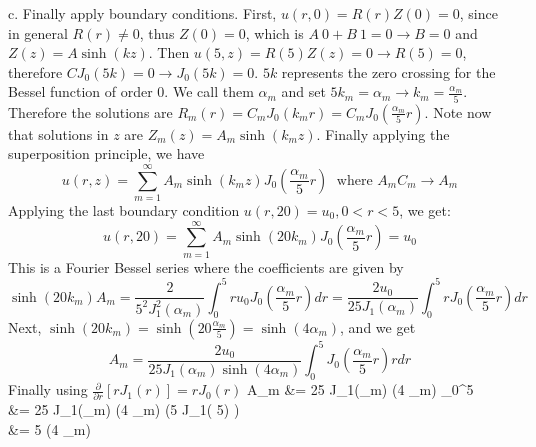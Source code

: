 \documentclass[12pt,twoside]{article}
\begin{document}
\item [c.]
Finally apply boundary conditions.
First, $u(r,0)= R(r) Z(0)=0$, since in general $R(r) \neq 0$, thus $Z(0)=0$, which is $A ~ 0 + B ~ 1 = 0 \rightarrow B = 0$
and $Z(z) = A \sinh(k z)$.
Then $u(5,z) = R(5) Z(z) = 0 \rightarrow R(5) = 0 $, therefore $C J_0(5k) = 0 \rightarrow J_0(5k) = 0$. $5k$ represents the zero crossing for the Bessel function of order 0.
We call them $\alpha_m$ and set $5k_m = \alpha_m  \rightarrow  k_m = \frac{\alpha_m}{5}$. Therefore the solutions are $R_m(r) = C_m J_0(k_m r) = C_m J_0(\frac{\alpha_m}{5} r)$.
Note now that solutions in $z$ are $Z_m(z) = A_m \sinh(k_m z)$. Finally applying the superposition principle, we have
\[
	u(r, z) = \sum_{m=1}^\infty A_m \sinh(k_m z) J_0(\frac{\alpha_m}{5} r) \; \text{ where  } A_m C_m \rightarrow A_m
\]
Applying the last boundary condition $u(r, 20) = u_0, 0 < r < 5$, we get:
\[
	u(r, 20) = \sum_{m=1}^\infty A_m \sinh(20 k_m) J_0(\frac{\alpha_m}{5} r) = u_0
\]
This is a Fourier Bessel series where the coefficients are given by
\[
	 \sinh(20 k_m) A_m = \frac{2} {5^2 J_1^2(\alpha_m)} \int_0^5 r u_0  J_0(\frac{\alpha_m}{5} r) dr =  \frac{2 u_0} {25 J_1(\alpha_m)} \int_0^5 r J_0(\frac{\alpha_m}{5} r) dr
\]
Next, $\sinh(20 k_m) =  \sinh(20 \frac{\alpha_m}{5}) =  \sinh(4 \alpha_m)$, and we get
\[
	 A_m = \frac{2 u_0} {25 J_1(\alpha_m)  \sinh(4 \alpha_m)} \int_0^5 J_0(\frac{\alpha_m}{5} r) r dr 
\]
Finally using $\frac{\partial}{\partial r} [ r J_1(r)] = r J_0(r)$ 
\ba
	 A_m		&=  {25 J_1(\alpha_m)  \sinh(4 \alpha_m)} _0^5 \\
	 	 	&=  {25 J_1(\alpha_m)  \sinh(4 \alpha_m)} \bigg (5 J_1( 5) \bigg ) \\
	 		&=  {5 \sinh(4 \alpha_m)}
\ea

\ee
\end{document}
